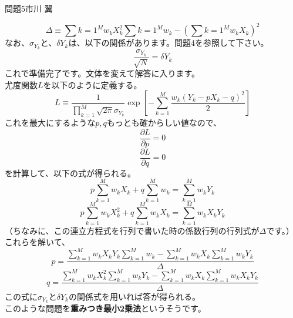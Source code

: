 \documentclass[fleqn]{jbook}
\begin{document}
\begin{answer}{問題5}{市川 翼}
\begin{enumerate}
\begin{equation}
		 \Delta \equiv \sum {k=1} ^M w_k X_{k}^{2} \sum {k=1} ^M w_k
			     - \left(\sum {k=1} ^M w_k X_k \right)^2
		\end{equation}
なお、$\sigma_{Y_k}$と、$\delta Y_k$は、以下の関係があります。問題4を参照して下さい。
		\begin{equation}
		 \frac{\sigma_{Y_k}}{\sqrt N} = \delta Y_k
		\end{equation}
これで準備完了です。文体を変えて解答に入ります。\\尤度関数$L$を以下のように定義する。
		\begin{equation}
		 L \equiv \frac{1}{\prod _{k=1}^M \sqrt{2\pi}\sigma_{Y_k}}
		          \exp\left[-\sum _{k=1}^M\frac{w_k (Y_k - pX_k - q)^2}
			  {2} \right]
		\end{equation}
これを最大にするような$p,q$もっとも確からしい値なので、
		\begin{equation}
		 \frac{\partial L}{\partial p} = 0
		\end{equation}
		\begin{equation}
		 \frac{\partial L}{\partial q} = 0
		\end{equation}
を計算して、以下の式が得られる。
		\begin{equation}
		 p\sum _{k=1}^M w_k X_k + q\sum _{k=1}^M w_k
                     = \sum _{k=1}^M w_k Y_k
		\end{equation}
		\begin{equation}
		 p\sum _{k=1}^M w_k X_{k}^{2} + q\sum _{k=1}^M w_k X_k
		     = \sum _{k=1}^M w_k X_k Y_k
		\end{equation}
（ちなみに、この連立方程式を行列で書いた時の係数行列の行列式が$\Delta$です。）
これらを解いて、
		\begin{equation}
		 p = \frac{\sum _{k=1}^M w_k X_k Y_k \sum _{k=1}^M w_k - 
		     \sum _{k=1}^M w_k X_k \sum _{k=1}^M w_k Y_k}{\Delta}
		\end{equation}
		\begin{equation}
		 q = \frac{\sum _{k=1}^M w_k X_{k}^{2} \sum _{k=1}^M w_k Y_k
                     - \sum _{k=1}^M w_k X_k \sum _{k=1}^M w_k X_k Y_k}{\Delta}
		\end{equation}
この式に$\sigma_{Y_k}$と$\delta Y_k$の関係式を用いれば答が得られる。\\このような問題を{\bf 重みつき最小2乗法}というそうです。
\end{enumerate}
\end{answer}
\end{document}
